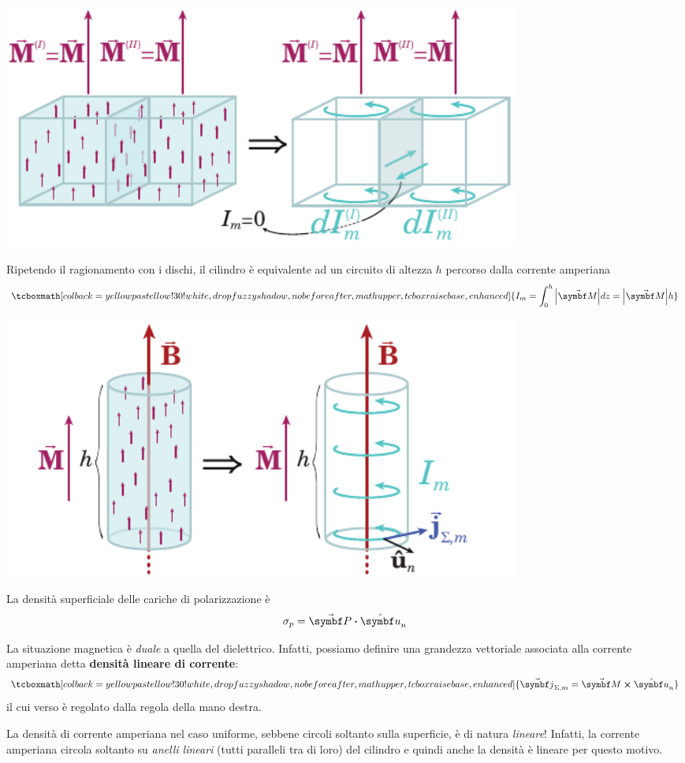 \begin{center}
	\includegraphics[width=0.75\textwidth]{images/chp12/chp12momento2.pdf}
\end{center}
Ripetendo il ragionamento con i dischi, il cilindro è equivalente ad un circuito di altezza $h$ percorso dalla corrente amperiana
\begin{equation}
		\tcboxmath[colback=yellowpastellow!30!white,drop fuzzy shadow, nobeforeafter, math upper, tcbox raise base, enhanced]{I_m=\int_{0}^{h}\abs{\vba{M}}dz=\abs{\vba{M}}h}
\end{equation}
\begin{center}
	\includegraphics[width=0.75\textwidth]{images/chp12/chp12momento3.pdf}
\end{center}
\begin{remember}
	La densità superficiale delle cariche di polarizzazione è
	\begin{equation}
		\sigma_p=\vba{P}\vdot\vbh{u}_n
	\end{equation}
\end{remember}
\noindent La situazione magnetica è \textit{duale} a quella del dielettrico. Infatti, possiamo definire una grandezza vettoriale associata alla corrente amperiana detta \textbf{densità lineare di corrente}:
\begin{equation}
	\tcboxmath[colback=yellowpastellow!30!white,drop fuzzy shadow, nobeforeafter, math upper, tcbox raise base, enhanced]{\vba{j}_{\Sigma, m}=\vba{M}\cross\vbh{u}_n}\label{CorrenteAmpereUnif}
\end{equation}
il cui verso è regolato dalla regola della mano destra.
\begin{attention}
	La densità di corrente amperiana nel caso uniforme, sebbene circoli soltanto sulla superficie, è di natura \textit{lineare}! Infatti, la corrente amperiana circola soltanto su \textit{anelli lineari} (tutti paralleli tra di loro) del cilindro e quindi anche la densità è lineare per questo motivo.
\end{attention}
